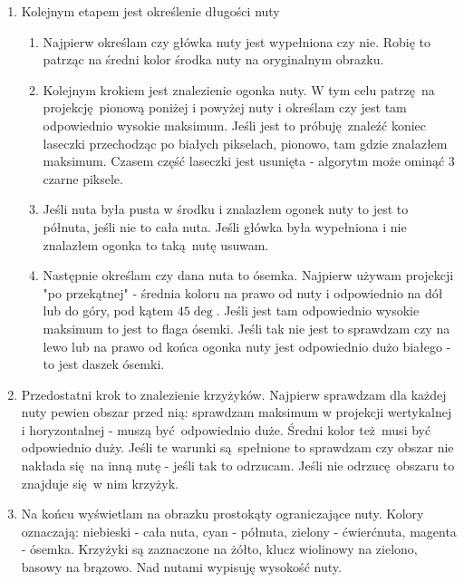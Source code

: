 \documentclass[12pt]{article}
\begin{document}
\begin{enumerate}
			\item Kolejnym etapem jest określenie długości nuty
				\begin{enumerate}
					\item Najpierw określam czy główka nuty jest wypełniona czy nie. Robię to patrząc na średni kolor środka nuty na oryginalnym obrazku.
					\item Kolejnym krokiem jest znalezienie ogonka nuty. W tym celu patrzę na projekcję pionową poniżej i powyżej nuty i określam czy jest tam odpowiednio wysokie maksimum. Jeśli jest to próbuję znaleźć koniec laseczki przechodząc po białych pikselach, pionowo, tam gdzie znalazłem maksimum. Czasem część laseczki jest usunięta - algorytm może ominąć 3 czarne piksele.
					\item Jeśli nuta była pusta w środku i znalazłem ogonek nuty to jest to półnuta, jeśli nie to cała nuta. Jeśli główka była wypełniona i nie znalazłem ogonka to taką nutę usuwam.
					\item Następnie określam czy dana nuta to ósemka. Najpierw używam projekcji "po przekątnej" - średnia koloru na prawo od nuty i odpowiednio na dół lub do góry, pod kątem $45\deg$. Jeśli jest tam odpowiednio wysokie maksimum to jest to flaga ósemki. Jeśli tak nie jest to sprawdzam czy na lewo lub na prawo od końca ogonka nuty jest odpowiednio dużo białego - to jest daszek ósemki.
				\end{enumerate}
			\item Przedostatni krok to znalezienie krzyżyków. Najpierw sprawdzam dla każdej nuty pewien obszar przed nią: sprawdzam maksimum w projekcji wertykalnej i horyzontalnej - muszą być odpowiednio duże. Średni kolor też musi być odpowiednio duży. Jeśli te warunki są spełnione to sprawdzam czy obszar nie nakłada się na inną nutę - jeśli tak to odrzucam. Jeśli nie odrzucę obszaru to znajduje się w nim krzyżyk.
			\item Na końcu wyświetlam na obrazku prostokąty ograniczające nuty. Kolory oznaczają: niebieski - cała nuta, cyan - półnuta, zielony - ćwierćnuta, magenta - ósemka. Krzyżyki są zaznaczone na żółto, klucz wiolinowy na zielono, basowy na brązowo. Nad nutami wypisuję wysokość nuty.
		\end{enumerate}
	
\end{document}
